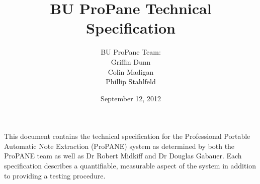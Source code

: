 \begin{titlepage}



\title{\textbf{BU ProPane Technical Specification}}
\author{BU ProPane Team:\\Griffin Dunn\\Colin Madigan\\Phillip Stahlfeld}
\date{September 12, 2012}
\maketitle



\noindent
This document contains the technical specification for the Professional Portable Automatic Note Extraction (ProPANE) system as determined by both the ProPANE team as well as Dr Robert Midkiff and Dr Douglas Gabauer. Each specification describes a quantifiable, measurable aspect of the system in addition to providing a testing procedure. 
\thispagestyle{empty}



\end{titlepage}